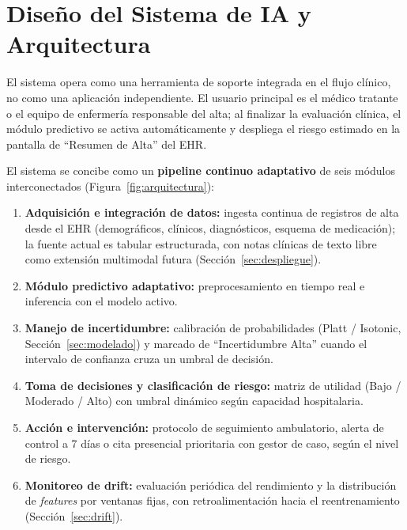 \documentclass[11pt,a4paper]{article}
\begin{document}
\section{Diseño del Sistema de IA y Arquitectura}
\label{sec:arquitectura}

El sistema opera como una herramienta de soporte integrada en el flujo clínico, no como una aplicación independiente. El usuario principal es el médico tratante o el equipo de enfermería responsable del alta; al finalizar la evaluación clínica, el módulo predictivo se activa automáticamente y despliega el riesgo estimado en la pantalla de ``Resumen de Alta'' del EHR.

El sistema se concibe como un \textbf{pipeline continuo adaptativo} de seis módulos interconectados (Figura~\ref{fig:arquitectura}):

\begin{enumerate}[leftmargin=*]
    \item \textbf{Adquisición e integración de datos:} ingesta continua de registros de alta desde el EHR (demográficos, clínicos, diagnósticos, esquema de medicación); la fuente actual es tabular estructurada, con notas clínicas de texto libre como extensión multimodal futura (Sección~\ref{sec:despliegue}).
    \item \textbf{Módulo predictivo adaptativo:} preprocesamiento en tiempo real e inferencia con el modelo activo.
    \item \textbf{Manejo de incertidumbre:} calibración de probabilidades (Platt / Isotonic, Sección~\ref{sec:modelado}) y marcado de ``Incertidumbre Alta'' cuando el intervalo de confianza cruza un umbral de decisión.
    \item \textbf{Toma de decisiones y clasificación de riesgo:} matriz de utilidad (Bajo / Moderado / Alto) con umbral dinámico según capacidad hospitalaria.
    \item \textbf{Acción e intervención:} protocolo de seguimiento ambulatorio, alerta de control a 7 días o cita presencial prioritaria con gestor de caso, según el nivel de riesgo.
    \item \textbf{Monitoreo de drift:} evaluación periódica del rendimiento y la distribución de \emph{features} por ventanas fijas, con retroalimentación hacia el reentrenamiento (Sección~\ref{sec:drift}).
\end{enumerate}
\end{document}
